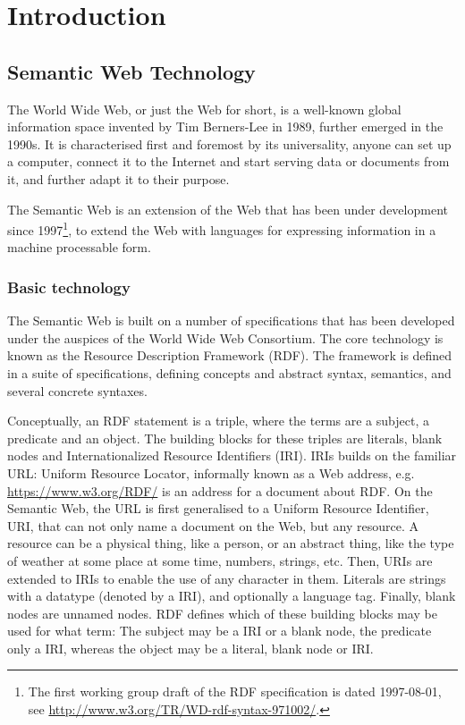 \chapter{Introduction}

\section{Semantic Web Technology}\label{sec:semwebtech}

The World Wide Web, or just the Web for short, is a well-known global
information space invented by Tim Berners-Lee in 1989, further emerged
in the 1990s. It is characterised first and foremost by its
universality, anyone can set up a computer, connect it to the Internet and
start serving data or documents from it, and further adapt it to their purpose. 

The Semantic Web is an extension of the Web that has been under
development since 1997\footnote{The first working group draft of the
  RDF specification is dated 1997-08-01, see
  \url{http://www.w3.org/TR/WD-rdf-syntax-971002/}.}, to extend the
Web with languages for expressing information in a machine processable
form\cite{semwebroadmap}.

\subsection{Basic technology}

The Semantic Web is built on a number of specifications that has been
developed under the auspices of the World Wide Web Consortium. The
core technology is known as the Resource Description Framework
(RDF). The framework is defined in a suite of specifications, defining
concepts and abstract syntax, semantics, and several concrete
syntaxes.

Conceptually, an RDF statement is a triple, where the terms are a
subject, a predicate and an object. The building blocks for these
triples are literals, blank nodes and Internationalized Resource
Identifiers (IRI). IRIs builds on the familiar URL: Uniform Resource
Locator, informally known as a Web address,
e.g. \url{https://www.w3.org/RDF/} is an address for a document about
RDF. On the Semantic Web, the URL is first generalised to a Uniform
Resource Identifier, URI, that can not only name a document on the
Web, but any resource. A resource can be a physical thing, like a
person, or an abstract thing, like the type of weather at some place
at some time, numbers, strings, etc. Then, URIs are extended to IRIs
to enable the use of any character in them. Literals are strings with
a datatype (denoted by a IRI), and optionally a language tag. Finally,
blank nodes are unnamed nodes. RDF defines which of these building
blocks may be used for what term: The subject may be a IRI or a blank
node, the predicate only a IRI, whereas the object may be a literal,
blank node or IRI.

